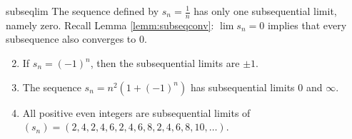 \begin{examples}{}{subseqlim}
	\exstart The sequence defined by $s_n=\frac 1n$ has only one subsequential limit, namely zero. Recall Lemma \ref{lemm:subseqconv}: $\lim s_n=0$ implies that every subsequence also converges to 0.
\begin{enumerate}\setcounter{enumi}{1}
  \item If $s_n=(-1)^n$, then the subsequential limits are $\pm 1$. %
  \item The sequence $s_n=n^2(1+(-1)^n)$ has subsequential limits 0 and $\infty$.
  \item All positive even integers are subsequential limits of $(s_n)=(2,4,2,4,6,2,4,6,8,2,4,6,8,10,\ldots)$.



\end{enumerate}
\end{examples}
